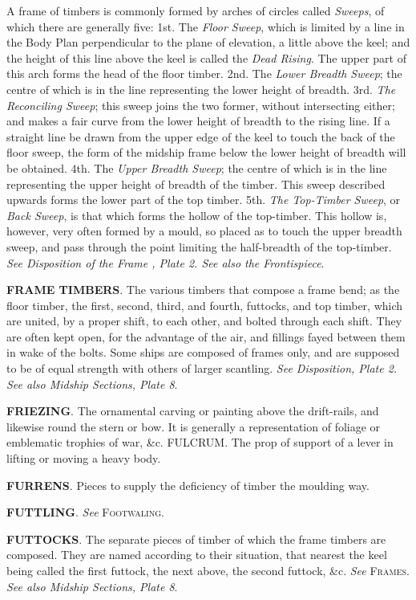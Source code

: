 A frame of timbers is commonly formed by arches of circles called \textit{Sweeps}, of which there are generally five: 1st. The \textit{Floor Sweep}, which is limited by a line in the Body Plan perpendicular to the plane of elevation, a little above the keel; and the height of this line above the keel is called the \textit{Dead Rising}. The upper part of this arch forms the head of the floor timber. 2nd. The \textit{Lower Breadth Sweep}; the centre of which is in the line representing the lower height of breadth. 3rd. \textit{The Reconciling Sweep}; this sweep joins the two former, without intersecting either; and makes a fair curve from the lower height of breadth to the rising line. If a straight line be drawn from the upper edge of the keel to touch the back of the floor sweep, the form of the midship frame below the lower height of breadth will be obtained. 4th. The \textit{Upper Breadth Sweep}; the centre of which is in the line representing the upper height of breadth of the timber. This sweep described upwards forms the lower part of the top timber. 5th. \textit{The Top-Timber Sweep}, or \textit{Back Sweep}, is that which forms the hollow of the top-timber. This hollow is, however, very often formed by a mould, so placed as to touch the upper breadth sweep, and pass through the point limiting the half-breadth of the top-timber. \textit{See Disposition of the Frame , Plate 2. See also the Frontispiece}. 

\textbf{FRAME TIMBERS}. The various timbers that compose a frame bend; as the floor timber, the first, second, third, and fourth, futtocks, and top timber, which are united, by a proper shift, to each other, and bolted through each shift. They are often kept open, for the advantage of the air, and fillings fayed between them in wake of the bolts. Some ships are composed of frames only, and are supposed to be of equal strength with others of larger scantling. \textit{See Disposition, Plate 2. See also Midship Sections, Plate 8}. 

\textbf{FRIEZING}. The ornamental carving or painting above the drift-rails, and likewise round the stern or bow. It is generally a representation of foliage or emblematic trophies of war, \&c. FULCRUM. The prop of support of a lever in lifting or moving a heavy body. 

\textbf{FURRENS}. Pieces to supply the deficiency of timber the moulding way. 

\textbf{FUTTLING}. \textit{See} \textsc{Footwaling}. 

\textbf{FUTTOCKS}. The separate pieces of timber of which the frame timbers are composed. They are named according to their situation, that nearest the keel being called the first futtock, the next above, the second futtock, \&c. \textit{See} \textsc{Frames}. \textit{See also Midship Sections, Plate 8}. 

